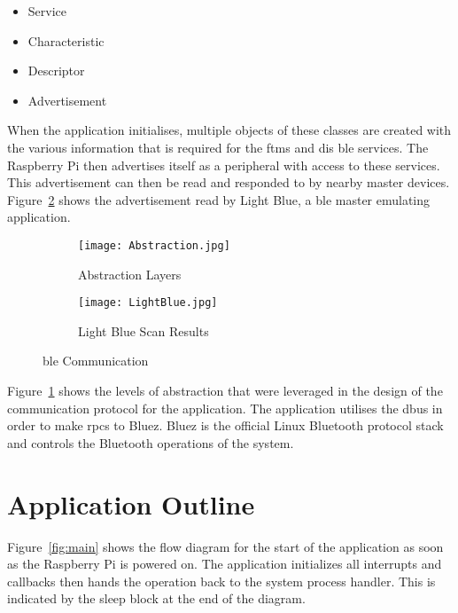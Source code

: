 \begin{itemize}
	\item Service
	\vspace*{-0.3cm}
	\item Characteristic
		\vspace*{-0.3cm}
	\item Descriptor
		\vspace*{-0.3cm}
	\item Advertisement
\end{itemize}

When the application initialises, multiple objects of these classes are created with the various information that is required for the \ac{ftms} and \ac{dis} \ac{ble} services. The Raspberry Pi then advertises itself as a peripheral with access to these services. This advertisement can then be read and responded to by nearby master devices. Figure~\ref{fig:blt} shows the advertisement read by Light Blue, a \ac{ble} master emulating application.

\begin{figure}[H]
	\centering
	\begin{subfigure}{.4\textwidth}
		\centering
		\texttt{[image: Abstraction.jpg]}
		\caption{Abstraction Layers}
		\label{fig:abs}
	\end{subfigure}%
	\begin{subfigure}{.4\textwidth}
		\centering
		\texttt{[image: LightBlue.jpg]}
		\caption{Light Blue Scan Results}
		\label{fig:blt}
	\end{subfigure}
	\caption{\ac{ble} Communication}
	\label{fig:bt}
\end{figure}

\vspace*{-0.9cm}

Figure~\ref{fig:abs} shows the levels of abstraction that were leveraged in the design of the communication protocol for the application. The application utilises the \ac{dbus} in order to make \acp{rpc} to Bluez. Bluez is the official Linux Bluetooth protocol stack and controls the Bluetooth operations of the system. \citep{Lee:2020}

\section{Application Outline}

Figure~\ref{fig:main} shows the flow diagram for the start of the application as soon as the Raspberry Pi is powered on. The application initializes all interrupts and callbacks then hands the operation back to the system process handler. This is indicated by the sleep block at the end of the diagram.

